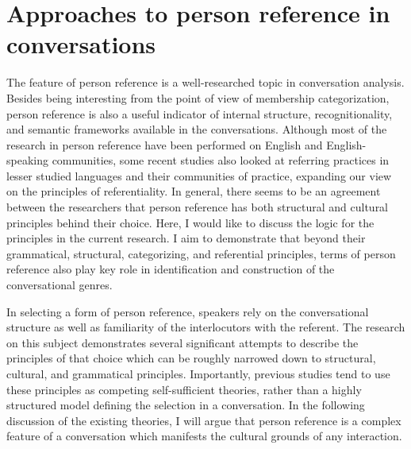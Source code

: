 \documentclass[12pt, draft]{article}
\begin{document}
\section{Approaches to person reference in conversations}
The feature of person reference is a well-researched topic in conversation analysis. Besides being interesting from the point of view of membership categorization, person reference is also a useful indicator of internal structure, recognitionality, and semantic frameworks available in the conversations. Although most of the research in person reference have been performed on English and English-speaking communities, some recent studies also looked at referring practices in lesser studied languages and their communities of practice, expanding our view on the principles of referentiality. In general, there seems to be an agreement between the researchers that person reference has both structural and cultural principles behind their choice. Here, I would like to discuss the logic for the principles in the current research. I aim to demonstrate that beyond their grammatical, structural, categorizing, and referential principles, terms of person reference also play key role in identification and construction of the conversational genres.

In selecting a form of person reference, speakers rely on the conversational structure as well as familiarity of the interlocutors with the referent. The research on this subject demonstrates several significant attempts to describe the principles of that choice which can be roughly narrowed down to structural, cultural, and grammatical principles. Importantly, previous studies tend to use these principles as competing self-sufficient theories, rather than a highly structured model defining the selection in a conversation. In the following discussion of the existing theories, I will argue that person reference is a complex feature of a conversation which manifests the cultural grounds of any interaction.
\end{document}

